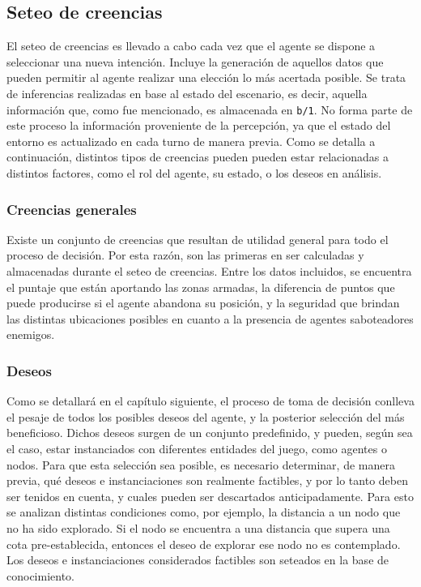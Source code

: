 \documentclass[oneside]{book}
\begin{document}
\subsection{Seteo de creencias}


El seteo de creencias es llevado a cabo cada vez que el agente se dispone a 
seleccionar una nueva intención. Incluye la generación de aquellos datos que pueden 
permitir al agente realizar una elección lo más acertada posible. Se trata de 
inferencias realizadas en base al estado del escenario, es decir, aquella información 
que, como fue mencionado, es almacenada en \texttt{b/1}. No forma parte de este proceso 
la información proveniente de la percepción, ya que el estado del entorno es actualizado 
en cada turno de manera previa. Como se detalla a continuación, distintos tipos de 
creencias pueden pueden estar relacionadas a distintos factores, como el rol del agente, 
su estado, o los deseos en análisis.

\subsubsection{Creencias generales}

Existe un conjunto de creencias que resultan de utilidad general para todo el proceso 
de decisión. Por esta razón, son las primeras en ser calculadas y almacenadas durante 
el seteo de creencias. Entre los datos incluidos, se encuentra el puntaje que están 
aportando las zonas armadas, la diferencia de puntos que puede producirse si el agente 
abandona su posición, y la seguridad que brindan las distintas ubicaciones posibles en 
cuanto a la presencia de agentes saboteadores enemigos. 

\subsubsection{Deseos}

Como se detallará en el capítulo siguiente, el proceso de toma de decisión conlleva el 
pesaje de todos los posibles deseos del agente, y la posterior selección del más beneficioso. 
Dichos deseos surgen de un conjunto predefinido, y pueden, según sea el caso, estar 
instanciados con diferentes entidades del juego, como agentes o nodos. Para que esta 
selección sea posible, es necesario determinar, de manera previa, qué deseos e instanciaciones 
son realmente factibles, y por lo tanto deben ser tenidos en cuenta, y cuales pueden ser 
descartados anticipadamente.
Para esto se analizan distintas condiciones como, por ejemplo, la distancia a un nodo 
que no ha sido explorado. Si el nodo se encuentra a una distancia que supera una cota 
pre-establecida, entonces el deseo de explorar ese nodo no es contemplado.
Los deseos e instanciaciones considerados factibles son seteados en la base de conocimiento.
\end{document}
